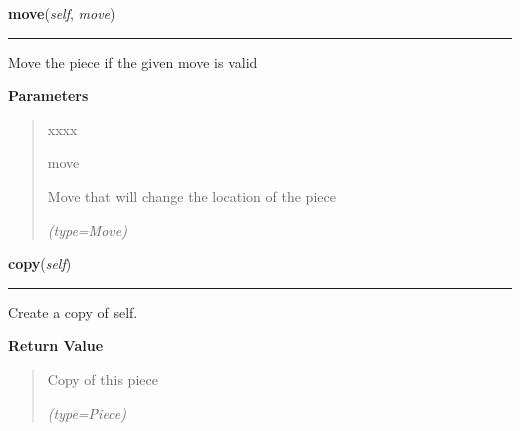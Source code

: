     \label{UnBlockMe:Map:Piece:Piece:move}

    \vspace{0.5ex}

\hspace{.8\funcindent}\begin{boxedminipage}{\funcwidth}

    \raggedright \textbf{move}(\textit{self}, \textit{move})

    \vspace{-1.5ex}

    \rule{\textwidth}{0.5\fboxrule}
\setlength{\parskip}{2ex}
    Move the piece if the given move is valid

\setlength{\parskip}{1ex}
      \textbf{Parameters}
      \vspace{-1ex}

      \begin{quote}
        \begin{Ventry}{xxxx}

          \item[move]

          Move that will change the location of the piece

            {\it (type=Move)}

        \end{Ventry}

      \end{quote}

    \end{boxedminipage}

    \label{UnBlockMe:Map:Piece:Piece:copy}

    \vspace{0.5ex}

\hspace{.8\funcindent}\begin{boxedminipage}{\funcwidth}

    \raggedright \textbf{copy}(\textit{self})

    \vspace{-1.5ex}

    \rule{\textwidth}{0.5\fboxrule}
\setlength{\parskip}{2ex}
    Create a copy of self.

\setlength{\parskip}{1ex}
      \textbf{Return Value}
    \vspace{-1ex}

      \begin{quote}
      Copy of this piece

      {\it (type=Piece)}

      \end{quote}

    \end{boxedminipage}


